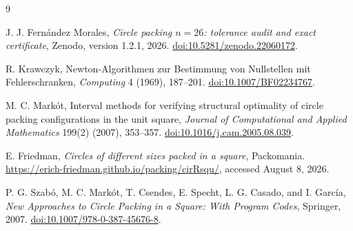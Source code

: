 \documentclass[11pt]{article}
\begin{document}
\begin{thebibliography}{9}

J. J. Fern\'andez Morales,
\emph{Circle packing $n=26$: tolerance audit and exact certificate},
Zenodo, version 1.2.1, 2026.
\href{https://doi.org/10.5281/zenodo.22060172}{doi:10.5281/zenodo.22060172}.

R. Krawczyk,
Newton-Algorithmen zur Bestimmung von Nullstellen mit Fehlerschranken,
\emph{Computing} 4 (1969), 187--201.
\href{https://doi.org/10.1007/BF02234767}{doi:10.1007/BF02234767}.

M. C. Mark\'ot,
Interval methods for verifying structural optimality of circle packing
configurations in the unit square,
\emph{Journal of Computational and Applied Mathematics} 199(2) (2007),
353--357.
\href{https://doi.org/10.1016/j.cam.2005.08.039}{doi:10.1016/j.cam.2005.08.039}.

E. Friedman,
\emph{Circles of different sizes packed in a square}, Packomania.
\url{https://erich-friedman.github.io/packing/cirRsqu/}, accessed August 8,
2026.

P. G. Szab\'o, M. C. Mark\'ot, T. Csendes, E. Specht, L. G. Casado, and
I. Garc\'ia,
\emph{New Approaches to Circle Packing in a Square: With Program Codes},
Springer, 2007.
\href{https://doi.org/10.1007/978-0-387-45676-8}{doi:10.1007/978-0-387-45676-8}.

\end{thebibliography}
\end{document}
